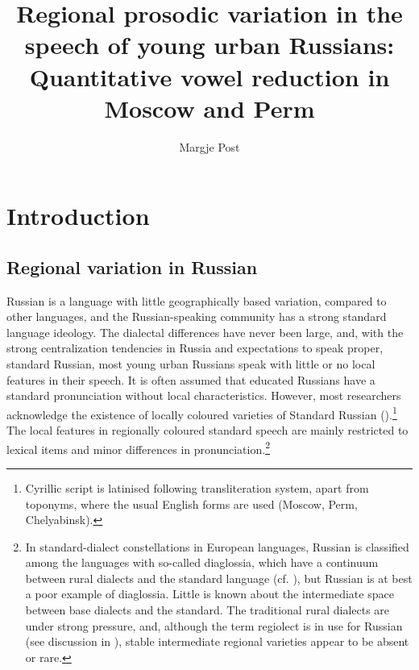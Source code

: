 \documentclass[output=paper]{langscibook}
\author{Margje Post\orcid{}\affiliation{University of Bergen}}
\title[Regional prosodic variation in the speech of young urban Russians]{Regional prosodic variation in the speech of young urban Russians: Quantitative vowel reduction in Moscow and Perm}
\begin{document}
\graphicspath{{figures/post}}
\maketitle
\label{chap:post}




\section{Introduction}
\label{sec:post:1}
\subsection{Regional variation in Russian}
\label{sec:post:1.1}
Russian is a language with little geographically based variation, compared to other languages, and the Russian-speaking community has a strong standard language ideology. The dialectal differences have never been large, and, with the strong centralization tendencies in Russia and expectations to speak proper, standard Russian, most young urban Russians speak with little or no local features in their speech. It is often assumed that educated Russians have a standard pronunciation without local characteristics. However, most researchers acknowledge the existence of locally coloured varieties of Standard Russian (\citealt{Panov1967, Krysin2007, Andrews2006, Krause2010, GrammatčikovaPožarickaja2013}).\footnote{Cyrillic script is latinised following  transliteration system, apart from toponyms, where the usual English forms are used (Moscow, Perm, Chelyabinsk).} The local features in regionally coloured standard speech are mainly restricted to lexical items and minor differences in pronunciation.\footnote{In  standard-dialect constellations in European languages, Russian is classified among the languages with so-called diaglossia, which have a continuum between rural dialects and the standard language (cf. \citealt{Krause2010}), but Russian is at best a poor example of diaglossia. Little is known about the intermediate space between base dialects and the standard. The traditional rural dialects are under strong pressure, and, although the term regiolect is in use for Russian (see discussion in \citealt{Krause2010}), stable intermediate regional varieties appear to be absent or rare.}
\end{document}
